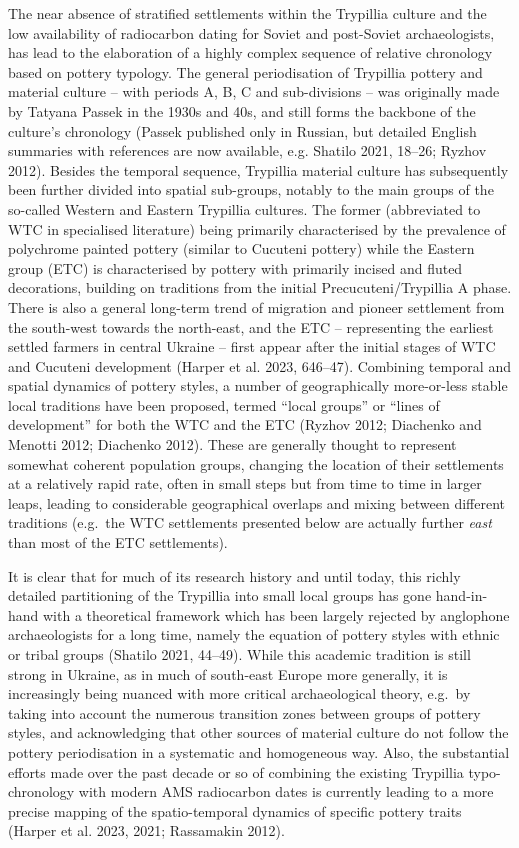 \documentclass[
  12pt,
  a4paper, twoside]{book}
\begin{document}
The near absence of stratified settlements within the Trypillia culture and the low availability of radiocarbon dating for Soviet and post-Soviet archaeologists, has lead to the elaboration of a highly complex sequence of relative chronology based on pottery typology. The general periodisation of Trypillia pottery and material culture -- with periods A, B, C and sub-divisions -- was originally made by Tatyana Passek in the 1930s and 40s, and still forms the backbone of the culture's chronology (Passek published only in Russian, but detailed English summaries with references are now available, e.g. Shatilo 2021, 18--26; Ryzhov 2012). Besides the temporal sequence, Trypillia material culture has subsequently been further divided into spatial sub-groups, notably to the main groups of the so-called Western and Eastern Trypillia cultures. The former (abbreviated to WTC in specialised literature) being primarily characterised by the prevalence of polychrome painted pottery (similar to Cucuteni pottery) while the Eastern group (ETC) is characterised by pottery with primarily incised and fluted decorations, building on traditions from the initial Precucuteni/Trypillia A phase. There is also a general long-term trend of migration and pioneer settlement from the south-west towards the north-east, and the ETC -- representing the earliest settled farmers in central Ukraine -- first appear after the initial stages of WTC and Cucuteni development (Harper et al. 2023, 646--47). Combining temporal and spatial dynamics of pottery styles, a number of geographically more-or-less stable local traditions have been proposed, termed ``local groups'' or ``lines of development'' for both the WTC and the ETC (Ryzhov 2012; Diachenko and Menotti 2012; Diachenko 2012). These are generally thought to represent somewhat coherent population groups, changing the location of their settlements at a relatively rapid rate, often in small steps but from time to time in larger leaps, leading to considerable geographical overlaps and mixing between different traditions (e.g.~the WTC settlements presented below are actually further \emph{east} than most of the ETC settlements).

It is clear that for much of its research history and until today, this richly detailed partitioning of the Trypillia into small local groups has gone hand-in-hand with a theoretical framework which has been largely rejected by anglophone archaeologists for a long time, namely the equation of pottery styles with ethnic or tribal groups (Shatilo 2021, 44--49). While this academic tradition is still strong in Ukraine, as in much of south-east Europe more generally, it is increasingly being nuanced with more critical archaeological theory, e.g.~by taking into account the numerous transition zones between groups of pottery styles, and acknowledging that other sources of material culture do not follow the pottery periodisation in a systematic and homogeneous way. Also, the substantial efforts made over the past decade or so of combining the existing Trypillia typo-chronology with modern AMS radiocarbon dates is currently leading to a more precise mapping of the spatio-temporal dynamics of specific pottery traits (Harper et al. 2023, 2021; Rassamakin 2012).
\end{document}
